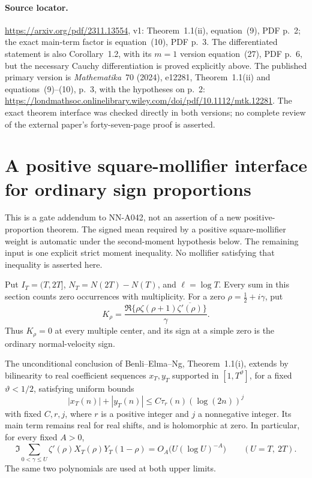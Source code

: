 \paragraph{Source locator.}
\url{https://arxiv.org/pdf/2311.13554}, v1:
Theorem~1.1(ii), equation~(9), PDF p.~2; the exact main-term
factor is equation~(10), PDF p.~3. The differentiated
statement is also Corollary~1.2, with its $m=1$ version
equation~(27), PDF p.~6, but the necessary Cauchy
differentiation is proved explicitly above.
The published primary version is \emph{Mathematika}~70 (2024),
e12281, Theorem~1.1(ii) and equations~(9)--(10), p.~3,
with the hypotheses on p.~2:
\url{https://londmathsoc.onlinelibrary.wiley.com/doi/pdf/10.1112/mtk.12281}.
The exact theorem interface was checked directly in both
versions; no complete review of the external paper's
forty-seven-page proof is asserted.


\section{A positive square-mollifier interface for ordinary sign proportions}
\label{sec:A042-square-mollifier-gate}

This is a gate addendum to NN-A042, not an assertion of a new
positive-proportion theorem.  The signed mean required by a positive
square-mollifier weight is automatic under the second-moment
hypothesis below.  The remaining input is one explicit strict
moment inequality.  No mollifier satisfying that inequality is
asserted here.

Put \(I_T=(T,2T]\), \(N_T=N(2T)-N(T)\), and \(\ell=\log T\).
Every sum in this section counts zero occurrences with multiplicity.
For a zero \(\rho=\frac12+i\gamma\), put
\[
 K_\rho=\frac{\Re\{\rho\zeta(\rho+1)
                              \overline{\zeta'(\rho)}\}}{\gamma}.
\]
Thus \(K_\rho=0\) at every multiple center, and its sign at a
simple zero is the ordinary normal-velocity sign.

\begin{lemma}
\label{lem:A042-bilinear-majorant}
The unconditional conclusion of Benli--Elma--Ng, Theorem~1.1(i),
extends by bilinearity to real coefficient sequences \(x_T,y_T\)
supported in \([1,T^\vartheta]\), for a fixed
\(\vartheta<1/2\), satisfying uniform bounds
\[
 |x_T(n)|+|y_T(n)|
       \le C\tau_r(n)(\log(2n))^j
\]
with fixed \(C,r,j\), where \(r\) is a positive integer and
\(j\) a nonnegative integer.  Its main term remains real for real
shifts, and is holomorphic at zero.  In particular, for every
fixed \(A>0\),
\[
 \Im\sum_{0<\gamma\le U}
        \zeta'(\rho)X_T(\rho)Y_T(1-\rho)
       =O_A\bigl(U(\log U)^{-A}\bigr)
       \qquad(U=T,\ 2T).
\]
The same two polynomials are used at both upper limits.
\end{lemma}

